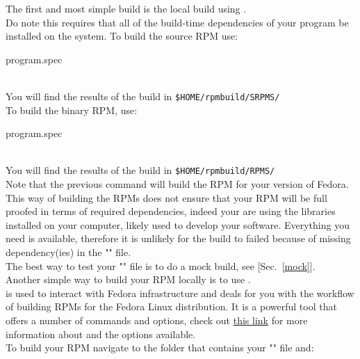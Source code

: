 The first and most simple build is the local build using . \\[0.25cm]
Do note this requires that all of the build-time dependencies of your program be installed on the system. To build the source RPM use: 
\begin{script}
\fprompt{~}   program.spec
\end{script}
\\[-0.75cm]
\noindent You will find the results of the build in \texttt{\$HOME/rpmbuild/SRPMS/}\\[0.25cm] 
To build the binary RPM, use:
\begin{script}
\fprompt{~}   program.spec
\end{script}
\\[-0.75cm]
\noindent You will find the results of the build in \texttt{\$HOME/rpmbuild/RPMS/} \\[0.25cm]
Note that the previous command will build the RPM for your version of Fedora. \\[0.25cm]
This way of building the RPMs does not ensure that your RPM will be full proofed in terms of required dependencies, 
indeed your are using the libraries installed on your computer, likely used to develop your software. 
Everything you need is available, therefore it is unlikely for the build to failed because of missing dependency(ies) in the "" file. \\ 
The best way to test your  "" file is to do a mock build, see [Sec.~\ref{mock}]. \\[0.25cm]
\clearpage
\noindent Another simple way to build your RPM locally is to use . \\
 is used to interact with Fedora infrastructure and deals for you with the workflow of building RPMs for the Fedora Linux distribution. 
It is a powerful tool that offers a number of commands and options, check out \href{https://docs.fedoraproject.org/en-US/package-maintainers/Package\_Maintenance\_Guide/#common\_fedpkg\_commands}{this link} for more information about  and the options available. \\[0.25cm] 
To build your RPM navigate to the folder that contains your "" file and:
